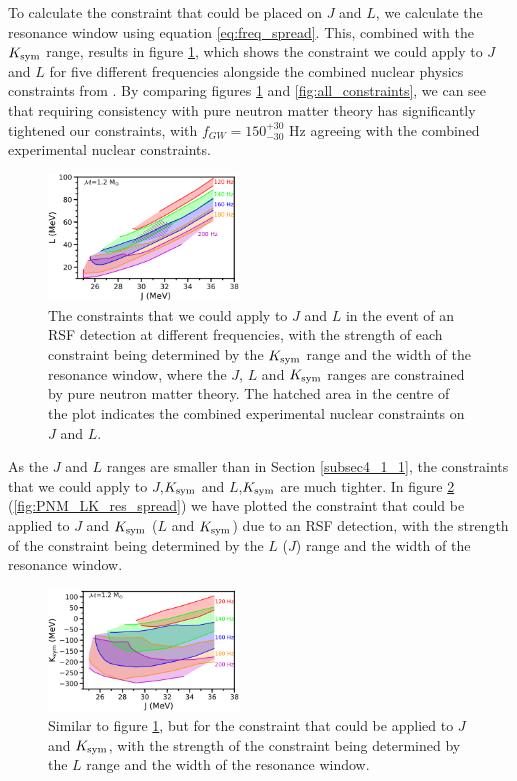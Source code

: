 \documentclass[fleqn,usenatbib]{mnras}
\begin{document}
To calculate the constraint that could be placed on $J$ and $L$, we calculate the resonance window using equation \ref{eq:freq_spread}. This, combined with the $K_{\rm sym}$ range, results in figure \ref{fig:PNM_JL_res_spread}, which shows the constraint we could apply to $J$ and $L$ for five different frequencies alongside the combined nuclear physics constraints from \citet{lattimer2013constraining}. By comparing figures \ref{fig:PNM_JL_res_spread} and \ref{fig:all_constraints}, we can see that requiring consistency with pure neutron matter theory has significantly tightened our constraints, with $f_{GW}=150^{+30}_{-30}$ Hz agreeing with the combined experimental nuclear constraints. 



\begin{figure}
\centering
\includegraphics[width=0.45\textwidth,angle=0]{PNM_JL_Kdfspread_2.png}
\caption{The constraints that we could apply to $J$ and $L$ in the event of an RSF detection at different frequencies, with the strength of each constraint being determined by the $K_{\rm sym}$ range and the width of the resonance window, where the $J$, $L$ and $K_{\rm sym}$ ranges are constrained by pure neutron matter theory. The hatched area in the centre of the plot indicates the combined experimental nuclear constraints on $J$ and $L$.}
\label{fig:PNM_JL_res_spread}
\end{figure}

As the $J$ and $L$ ranges are smaller than in Section \ref{subsec4_1_1}, the constraints that we could apply to $J$,$K_{\rm sym}$ and $L$,$K_{\rm sym}$ are much tighter. In figure \ref{fig:PNM_JK_res_spread} (\ref{fig:PNM_LK_res_spread}) we have plotted the constraint that could be applied to $J$ and $K_{\rm sym}$ ($L$ and $K_{\rm sym}$) due to an RSF detection, with the strength of the constraint being determined by the $L$ ($J$) range and the width of the resonance window.

\begin{figure}
\centering
\includegraphics[width=0.45\textwidth,angle=0]{PNM_JK_Ldfspread.png}
\caption{Similar to figure \ref{fig:PNM_JL_res_spread}, but for the constraint that could be applied to $J$ and $K_{\rm sym}$, with the strength of the constraint being determined by the $L$ range and the width of the resonance window.}
\label{fig:PNM_JK_res_spread}
\end{figure}
\end{document}
